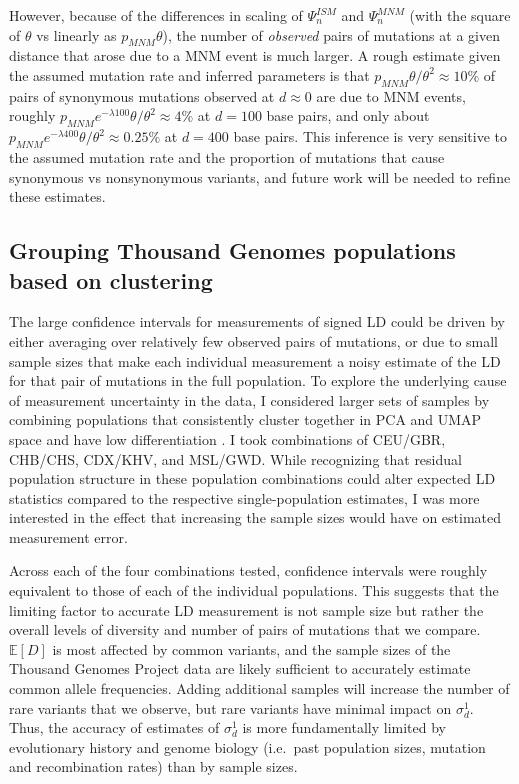\documentclass[]{article}
\begin{document}
However, because of the differences in scaling of \(\Psi_n^{ISM}\) and
\(\Psi_n^{MNM}\) (with the square of \(\theta\) vs linearly as
\(p_{MNM}\theta\)), the number of \emph{observed} pairs of mutations at a given
distance that arose due to a MNM event is much larger. A rough estimate given
the assumed mutation rate and inferred parameters is that \(p_{MNM}\theta /
\theta^2 \approx 10\%\) of pairs of synonymous mutations observed at
\(d\approx0\) are due to MNM events, roughly \(p_{MNM}e^{-\lambda 100}\theta /
\theta^2 \approx 4\%\) at \(d=100\) base pairs, and only about
\(p_{MNM}e^{-\lambda 400}\theta / \theta^2 \approx 0.25\%\) at \(d=400\) base
pairs. This inference is very sensitive to the assumed mutation rate and the
proportion of mutations that cause synonymous vs nonsynonymous variants, and
future work will be needed to refine these estimates.

\subsection{Grouping Thousand Genomes populations based on clustering}

The large confidence intervals for measurements of signed LD could be driven by
either averaging over relatively few observed pairs of mutations, or due to
small sample sizes that make each individual measurement a noisy estimate of
the LD for that pair of mutations in the full population. To explore the
underlying cause of measurement uncertainty in the
\citet{1000_Genomes_Project_Consortium2015-zq} data, I considered larger sets of
samples by combining populations that consistently cluster together in PCA and
UMAP space and have low differentiation \citep{Diaz-Papkovich2020-ee}. I took
combinations of CEU/GBR, CHB/CHS, CDX/KHV, and MSL/GWD. While recognizing that
residual population structure in these population combinations could alter
expected LD statistics compared to the respective single-population estimates,
I was more interested in the effect that increasing the sample sizes would have
on estimated measurement error.

Across each of the four combinations tested, confidence intervals were roughly
equivalent to those of each of the individual populations. This suggests that
the limiting factor to accurate LD measurement is not sample size but rather
the overall levels of diversity and number of pairs of mutations that we
compare. \(\mathbb{E}[D]\) is most affected by common variants, and the sample
sizes of the Thousand Genomes Project data are likely sufficient to accurately
estimate common allele frequencies. Adding additional samples will increase the
number of rare variants that we observe, but rare variants have minimal impact
on \(\sigma_d^1\). Thus, the accuracy of estimates of \(\sigma_d^1\) is more
fundamentally limited by evolutionary history and genome biology (i.e.~past
population sizes, mutation and recombination rates) than by sample sizes.
\end{document}
